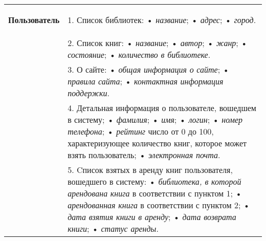 \begin{longtable}{|p{0.5cm}|p{15.5cm}|}
	\begin{rotatebox}[origin=r]{90}
		{\textbf{Пользователь}}
	\end{rotatebox} 
	& 
	1. Список библиотек: \newline
    • \textit{название}; \newline
    • \textit{адрес}; \newline
    • \textit{город}. \\
	\cline{2-2}
    &
  2. Список книг: \newline
    • \textit{название}; \newline
    • \textit{автор}; \newline
    • \textit{жанр}; \newline
    • \textit{состояние}; \newline
    • \textit{количество в библиотеке}. \\
	\cline{2-2}
    &
	3. О сайте: \newline
   • \textit{общая информация о сайте}; \newline
   • \textit{правила сайта}; \newline
   • \textit{контактная информация поддержки}. \\
    \cline{2-2}
    &
  4. Детальная информация о пользователе, вошедшем в систему; \newline
    • \textit{фамилия}; \newline
    • \textit{имя}; \newline
    • \textit{логин}; \newline
    • \textit{номер телефона}; \newline
    • \textit{рейтинг} число от 0 до 100, характеризующее количество книг, которое может взять пользователь; \newline
    • \textit{электронная почта}.\\
	\cline{2-2}
	&
	5. Cписок взятых в аренду книг пользователя, вошедшего в систему: \newline
	• \textit{библиотека, в которой арендована книга} в соответствии с пунктом 1; \newline
	• \textit{арендованная книга} в соответствии с пунктом 2; \newline
	• \textit{дата взятия книги в аренду}; \newline
	• \textit{дата возврата книги}; \newline
  • \textit{статус аренды}. \\
	

\end{longtable}
